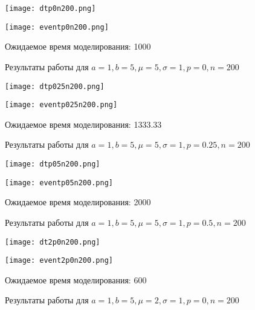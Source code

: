 \begin{figure}[h]
    \begin{minipage}{0.45\textwidth}
        \texttt{[image: dtp0n200.png]}
    \end{minipage}
    \hfill
    \begin{minipage}{0.45\textwidth}
        \texttt{[image: eventp0n200.png]}
    \end{minipage}
    \begin{center}
        Ожидаемое время моделирования: 1000
    \end{center}
    \caption{Результаты работы для $a=1, b=5, \mu=5, \sigma=1, p=0, n=200$}
\end{figure}

\begin{figure}[h]
    \begin{minipage}{0.45\textwidth}
        \texttt{[image: dtp025n200.png]}
    \end{minipage}
    \hfill
    \begin{minipage}{0.45\textwidth}
        \texttt{[image: eventp025n200.png]}
    \end{minipage}
    \begin{center}
        Ожидаемое время моделирования: 1333.33
    \end{center}
    \caption{Результаты работы для $a=1, b=5, \mu=5, \sigma=1, p=0.25, n=200$}
\end{figure}

\begin{figure}[h]
    \begin{minipage}{0.45\textwidth}
        \texttt{[image: dtp05n200.png]}
    \end{minipage}
    \hfill
    \begin{minipage}{0.45\textwidth}
        \texttt{[image: eventp05n200.png]}
    \end{minipage}
    \begin{center}
        Ожидаемое время моделирования: 2000
    \end{center}
    \caption{Результаты работы для $a=1, b=5, \mu=5, \sigma=1, p=0.5, n=200$}
\end{figure}

\begin{figure}[h]
    \begin{minipage}{0.45\textwidth}
        \texttt{[image: dt2p0n200.png]}
    \end{minipage}
    \hfill
    \begin{minipage}{0.45\textwidth}
        \texttt{[image: event2p0n200.png]}
    \end{minipage}
    \begin{center}
        Ожидаемое время моделирования: 600
    \end{center}
    \caption{Результаты работы для $a=1, b=5, \mu=2, \sigma=1, p=0, n=200$}
\end{figure}

